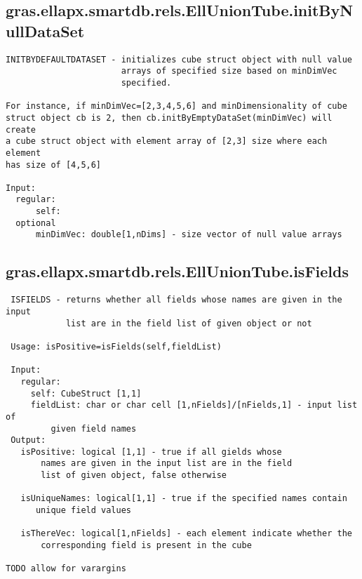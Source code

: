 \subsection{\texorpdfstring{gras.ellapx.smartdb.rels.EllUnionTube.initByNullDataSet}{initByNullDataSet}}\label{method:gras.ellapx.smartdb.rels.EllUnionTube.initByNullDataSet}
\begin{verbatim}
INITBYDEFAULTDATASET - initializes cube struct object with null value
                       arrays of specified size based on minDimVec
                       specified.

For instance, if minDimVec=[2,3,4,5,6] and minDimensionality of cube
struct object cb is 2, then cb.initByEmptyDataSet(minDimVec) will create
a cube struct object with element array of [2,3] size where each element
has size of [4,5,6]

Input:
  regular:
      self:
  optional
      minDimVec: double[1,nDims] - size vector of null value arrays
\end{verbatim}
\subsection{\texorpdfstring{gras.ellapx.smartdb.rels.EllUnionTube.isFields}{isFields}}\label{method:gras.ellapx.smartdb.rels.EllUnionTube.isFields}
\begin{verbatim}
 ISFIELDS - returns whether all fields whose names are given in the input
            list are in the field list of given object or not

 Usage: isPositive=isFields(self,fieldList)

 Input:
   regular:
     self: CubeStruct [1,1]
     fieldList: char or char cell [1,nFields]/[nFields,1] - input list of
         given field names
 Output:
   isPositive: logical [1,1] - true if all gields whose
       names are given in the input list are in the field
       list of given object, false otherwise

   isUniqueNames: logical[1,1] - true if the specified names contain
      unique field values

   isThereVec: logical[1,nFields] - each element indicate whether the
       corresponding field is present in the cube

TODO allow for varargins
\end{verbatim}
